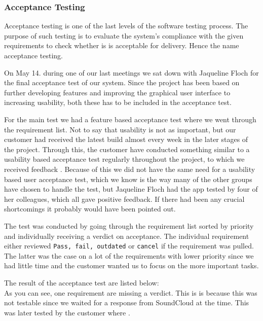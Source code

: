\subsubsection{Acceptance Testing}
Acceptance testing is one of the last levels of the software testing process. The purpose of such testing is to evaluate the system's compliance with the given requirements to check whether is is acceptable for delivery. Hence the name acceptance testing.

On May 14. during one of our last meetings we sat down with Jaqueline Floch for the final acceptance test of our system. Since the project has been based on further developing features and improving the graphical user interface to increasing usability, both these has to be included in the acceptance test.

For the main test we had a feature based acceptance test where we went through the requirement list. Not to say that usability is not as important, but our customer had received the latest build almost every week in the later stages of the project. Through this, the customer have conducted something similar to a usability based acceptance test regularly throughout the project, to which we received feedback . Because of this we did not have the same need for a usability based user acceptance test, which we know is the way many of the other groups have chosen to handle the test, but Jaqueline Floch had the app tested by four of her colleagues, which all gave positive feedback. If there had been any crucial shortcomings it probably would have been pointed out.

The test was conducted by going through the requirement list sorted by priority and individually receiving a verdict on acceptance. The individual requirement either reviewed \texttt{Pass, fail, outdated} or \texttt{cancel} if the requirement was pulled. The latter was the case on a lot of the requirements with lower priority since we had little time and the customer wanted us to focus on the more important tasks.

The result of the acceptance test are listed below:\\



As you can see, one requirement are missing a verdict. This is is because this was not testable since we waited for a response from SoundCloud at the time. This was later tested by the customer where .


